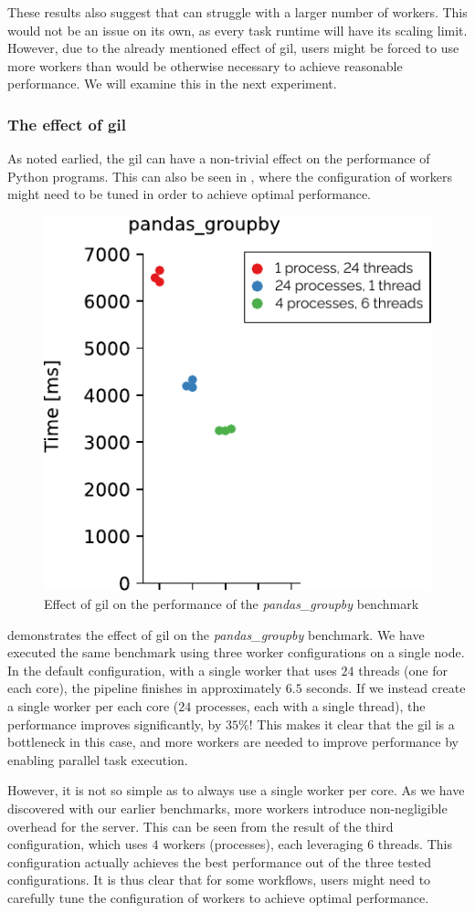 These results also suggest that \dask{} can struggle with a larger number of
workers. This would not be an issue on its own, as every task runtime will have its scaling limit.
However, due to the already mentioned effect of \gls{gil},
\dask{} users might be forced to use more workers than would be otherwise
necessary to achieve reasonable performance. We will examine this in the next experiment.

\subsubsection*{The effect of \gls{gil}}
As noted earlied, the \gls{gil} can have a non-trivial effect on the performance
of Python programs. This can also be seen in \dask{}, where the configuration
of workers might need to be tuned in order to achieve optimal performance.

\begin{figure}
	\centering
	\includegraphics[width=0.3\linewidth]{./imgs/rsds/charts/dask-gil-scaling}
	\caption{Effect of \gls{gil} on the performance of the \emph{pandas\_groupby} benchmark}
	\label{fig:dask-gil-scaling}
\end{figure}

 demonstrates the effect of \gls{gil} on the
\emph{pandas\_groupby} benchmark. We have executed the same benchmark using three
\dask{} worker configurations on a single node. In the default configuration,
with a single worker that uses $24$ threads (one for each core), the pipeline
finishes in approximately $6.5$ seconds. If we instead create a single worker
per each core ($24$ processes, each with a single thread), the performance
improves significantly, by $35\%$! This makes it clear that the
\gls{gil} is a bottleneck in this case, and more \dask{}
workers are needed to improve performance by enabling parallel task execution.

However, it is not so simple as to always use a single \dask{} worker per core.
As we have discovered with our earlier benchmarks, more workers introduce non-negligible overhead
for the \dask{} server. This can be seen from the result of the third
configuration, which uses $4$ \dask{} workers
(processes), each leveraging $6$ threads. This configuration actually
achieves the best performance out of the three tested configurations. It is thus clear that for
some \dask{} workflows, users might need to carefully tune the configuration of
workers to achieve optimal performance.

